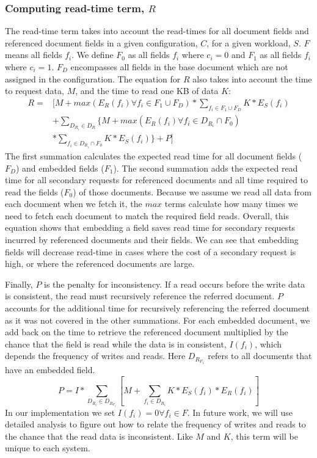\subsubsection{Computing read-time term, $R$}
The read-time term takes into account the read-times for all document fields and referenced document fields in a given configuration, $C$, for a given workload, $S$. 
$F$ means all fields $f_i$. 
We define $F_0$ as all fields $f_i$ where $c_i = 0$ and $F_1$ as all fields $f_i$ where $c_i = 1$. $F_D$ encompasses all fields in the base document which are not assigned in the configuration. 
The equation for $R$ also takes into account the time to request data, $M$, and the time to read one KB of data $K$:
\begin{align*}
R =& [M + max(E_R(f_i) \forall f_i \in F_1 \cup F_D)*\sum_{f_i \in F_1 \cup F_D} K*E_S(f_i)\\
& + \sum_{D_{R_i} \in D_R} \{M + max(E_R(f_i) \forall f_i \in D_{R_i} \cap F_0)\\
& * \sum_{f_i \in D_{R_i} \cap F_0} K*E_S(f_i)\} + P]
\end{align*}
The first summation calculates the expected read time for all document fields ($F_D$) and embedded fields ($F_1$). 
The second summation adds the expected read time for all secondary requests for referenced documents and all time required to read the fields ($F_0$) of those documents. 
Because we assume we read all data from each document when we fetch it, the $max$ terms calculate how many times we need to fetch each document to match the required field reads. 
Overall, this equation shows that embedding a field saves read time for secondary requests incurred by referenced documents and their fields. 
We can see that embedding fields will decrease read-time in cases where the cost of a secondary request is high, or where the referenced documents are large.

Finally, $P$ is the penalty for inconsistency. 
If a read occurs before the write data is consistent, the read must recursively reference the referred document. 
$P$ accounts for the additional time for recursively referencing the referred document as it was not covered in the other summations. 
For each embedded document, we add back on the time to retrieve the referenced document multiplied by the chance that the field is read while the data is in consistent, $I(f_i)$, which depends the frequency of writes and reads. 
Here $D_{R_{F_1}}$ refers to all documents that have an embedded field. 
$$P = I*\sum_{D_{R_i} \in D_{R_{F_1}}} [M+\sum_{f_i \in D_{R_i}} K*E_S(f_i)*E_R(f_i)]$$
In our implementation we set $I(f_i) = 0 \forall f_i \in F$. 
In future work, we will use detailed analysis to figure out how to relate the frequency of writes and reads to the chance that the read data is inconsistent. 
Like $M$ and $K$, this term will be unique to each system.

